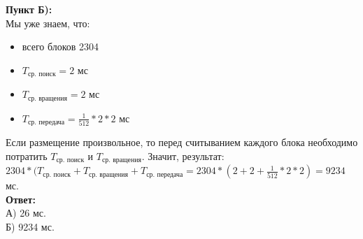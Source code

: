 \documentclass[12pt, letterpaper]{article}
\begin{document}
\textbf{Пункт Б):}\\
Мы уже знаем, что:
\begin{itemize}
\item всего блоков 2304
\item $T_\text{ср. поиск} = 2$ мс
\item $T_\text{ср. вращения} = 2$ мс
\item $T_\text{ср. передача} =\frac{1}{512} * 2 * 2$ мс
\end{itemize}
Если размещение произвольное, то перед считыванием каждого блока необходимо потратить $T_\text{ср. поиск}$ и $T_\text{ср. вращения}$. Значит, результат: $2304 * (T_\text{ср. поиск} + T_\text{ср. вращения} + T_\text{ср. передача} = 2304 * (2 + 2 + \frac{1}{512} * 2 * 2) = 9234$ мс.\\

\textbf{Ответ:}\\
А) 26 мс.\\
Б) 9234 мс.
\newpage
\end{document}

